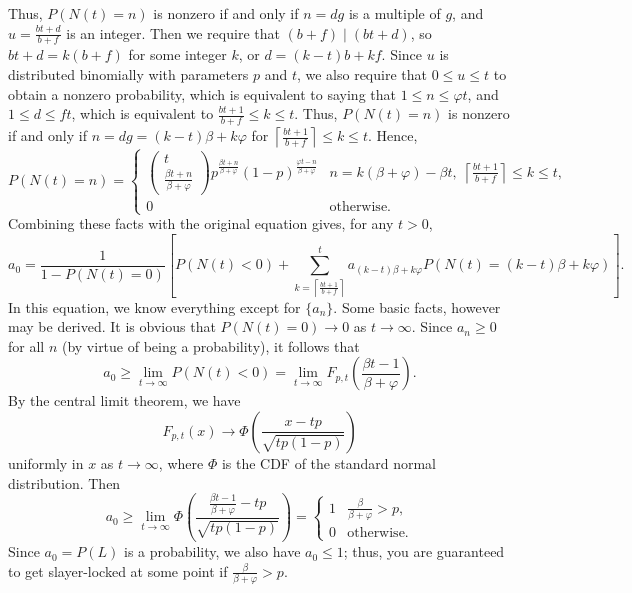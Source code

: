 \documentclass[letterpaper]{article}
\begin{document}
Thus, $P(N(t){=}n)$ is nonzero if and only if $n = dg$ is a multiple of $g$, and $u = \frac{b t + d}{b+f}$ is an integer. Then we require that $(b+f)\mid (bt + d)$, so $bt+d = k(b+f)$ for some integer $k$, or $d = (k-t)b + kf$. Since $u$ is distributed binomially with parameters $p$ and $t$, we also require that $0 \le u \le t$ to obtain a nonzero probability, which is equivalent to saying that $1\le n \le \varphi t$, and $1 \le d \le ft$, which is equivalent to $\frac{bt+1}{b+f}\le k\le t$. Thus, $P(N(t) =n )$ is nonzero if and only if $n = dg = (k-t)\beta + k \varphi$ for $\left\lceil\frac{bt + 1}{b+f}\right\rceil \le k \le t$. 
Hence,
\begin{equation*}
	P(N(t){=}n) = \begin{cases}
		\left(\begin{matrix}t \\[0.2em]\frac{\beta t + n}{\beta + \varphi}\end{matrix}\right)p^\frac{\beta t + n}{\beta+\varphi}(1-p)^\frac{\varphi t - n}{\beta+\varphi} & n = k(\beta + \varphi) - \beta t, \; \left\lceil \frac{bt+1}{b+f}\right\rceil \le k \le t,\\
		0 & \text{otherwise}.
	\end{cases}
\end{equation*}
Combining these facts with the original equation gives, for any $t>0$,
\begin{equation}
	\label{eq:recurrence}
	a_0 = \frac{1}{1-P(N(t){=}0)}\left[P(N(t){<} 0) + \sum_{k=\left\lceil\frac{bt+1}{b+f}\right\rceil}^{t} a_{(k-t)\beta + k\varphi}P(N(t){=}(k-t)\beta + k\varphi)\right].
\end{equation}
In this equation, we know everything except for $\{a_n\}$. Some basic facts, however may be derived. It is obvious that $P(N(t){=}0) \to 0 $ as $t \to \infty$. Since $a_n \ge 0$ for all $n$ (by virtue of being a probability), it follows that
\begin{equation*}
	a_0 \ge \lim_{t\to \infty}P(N(t){<}0) = \lim_{t\to\infty}F_{p,t}\left(\frac{\beta t - 1}{\beta + \varphi}\right).
\end{equation*}
By the central limit theorem, we have
\begin{equation*}
	F_{p,t}(x) \to \Phi\left(\frac{x - tp}{\sqrt{tp(1-p)}}\right)
\end{equation*}
uniformly in $x$ as $t \to \infty$, where $\Phi$ is the CDF of the standard normal distribution. Then
\begin{equation}
	\label{eq:lower_bound}
	a_0 \ge \lim_{t\to\infty}\Phi\left(\frac{\frac{\beta t - 1}{\beta +\varphi} - tp}{\sqrt{tp(1-p)}}\right) =\begin{cases}
		1 & \frac{\beta}{\beta+\varphi} > p, \\
		0 & \text{otherwise}.
	\end{cases}
\end{equation}
Since $a_0 = P(L)$ is a probability, we also have $a_0 \le 1$; thus, you are guaranteed to get slayer-locked at some point if $\frac{\beta}{\beta + \varphi} > p$.
\end{document}
